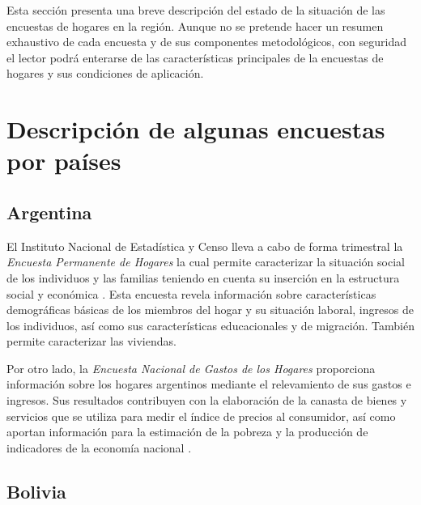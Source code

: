 \documentclass[
  12pt,
  spanish,
]{book}
\begin{document}
Esta sección presenta una breve descripción del estado de la situación de las encuestas de hogares en la región. Aunque no se pretende hacer un resumen exhaustivo de cada encuesta y de sus componentes metodológicos, con seguridad el lector podrá enterarse de las características principales de la encuestas de hogares y sus condiciones de aplicación.

\hypertarget{descripciuxf3n-de-algunas-encuestas-por-pauxedses}{%
\section{Descripción de algunas encuestas por países}\label{descripciuxf3n-de-algunas-encuestas-por-pauxedses}}

\hypertarget{argentina}{%
\subsection{Argentina}\label{argentina}}

El Instituto Nacional de Estadística y Censo lleva a cabo de forma trimestral la \emph{Encuesta Permanente de Hogares} la cual permite caracterizar la situación social de los individuos y las familias teniendo en cuenta su inserción en la estructura social y económica \citep{INDEC-AR}. Esta encuesta revela información sobre características demográficas básicas de los miembros del hogar y su situación laboral, ingresos de los individuos, así como sus características educacionales y de migración. También permite caracterizar las viviendas.

Por otro lado, la \emph{Encuesta Nacional de Gastos de los Hogares} proporciona información sobre los hogares argentinos mediante el relevamiento de sus gastos e ingresos. Sus resultados contribuyen con la elaboración de la canasta de bienes y servicios que se utiliza para medir el índice de precios al consumidor, así como aportan información para la estimación de la pobreza y la producción de indicadores de la economía nacional \citep{INDEC-AR2}.

\hypertarget{bolivia}{%
\subsection{Bolivia}\label{bolivia}}
\end{document}
